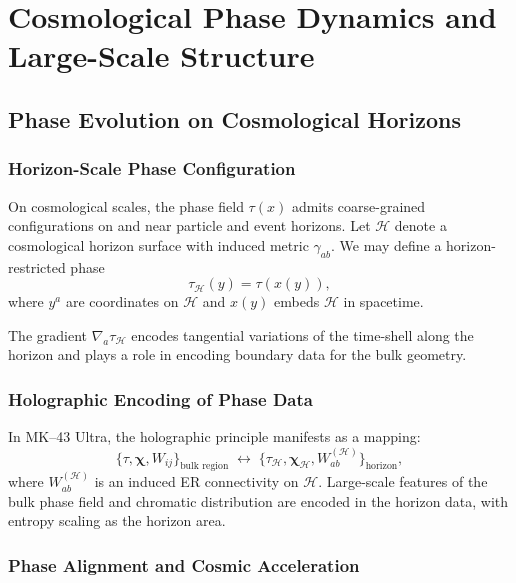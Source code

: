 

\part{Cosmological Phase Dynamics and Large-Scale Structure}

\chapter{Phase Evolution on Cosmological Horizons}

\section{Horizon-Scale Phase Configuration}

On cosmological scales, the phase field $\tau(x)$ admits coarse-grained configurations on and near particle and event horizons.
Let $\mathcal{H}$ denote a cosmological horizon surface with induced metric $\gamma_{ab}$.
We may define a horizon-restricted phase
\[
  \tau_{\mathcal{H}}(y) = \tau(x(y)),
\]
where $y^a$ are coordinates on $\mathcal{H}$ and $x(y)$ embeds $\mathcal{H}$ in spacetime.

The gradient $\nabla_a \tau_{\mathcal{H}}$ encodes tangential variations of the time-shell along the horizon and plays a role in encoding boundary data for the bulk geometry.

\section{Holographic Encoding of Phase Data}

In MK--43 Ultra, the holographic principle manifests as a mapping:
\[
  \{\tau,\bm{\chi},W_{ij}\}_{\text{bulk region}} \;\longleftrightarrow\;
  \{\tau_{\mathcal{H}},\bm{\chi}_{\mathcal{H}},W_{ab}^{(\mathcal{H})}\}_{\text{horizon}},
\]
where $W_{ab}^{(\mathcal{H})}$ is an induced ER connectivity on $\mathcal{H}$.
Large-scale features of the bulk phase field and chromatic distribution are encoded in the horizon data, with entropy scaling as the horizon area.

\section{Phase Alignment and Cosmic Acceleration}


